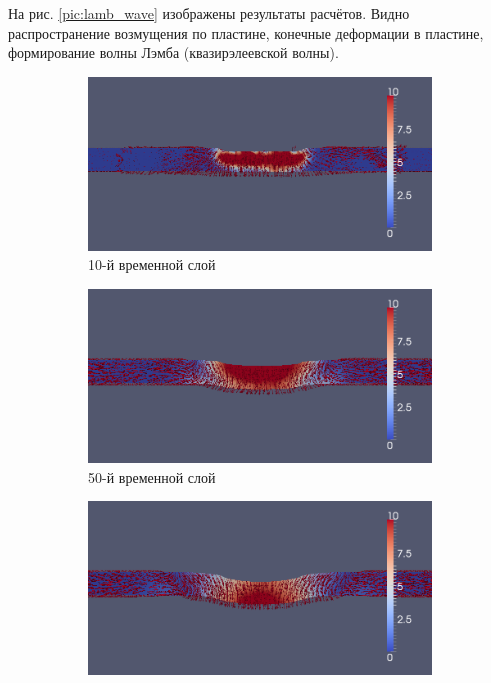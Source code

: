 На рис. \ref{pic:lamb_wave} изображены результаты расчётов. Видно распространение возмущения по пластине, конечные деформации в пластине, формирование волны Лэмба (квазирэлеевской волны).


\begin{figure}[htp]
\begin{subfigure}[b]{0.5\textwidth}
\centering
\includegraphics[width=\textwidth]{png/lamb-wave/010.png}
\caption{10-й временной слой}
\end{subfigure}
\begin{subfigure}[b]{0.5\textwidth}
\centering
\includegraphics[width=\textwidth]{png/lamb-wave/050.png}
\caption{50-й временной слой}
\end{subfigure}
\begin{subfigure}[b]{0.5\textwidth}
\centering
\includegraphics[width=\textwidth]{png/lamb-wave/090.png}

\end{subfigure}
\end{figure}
